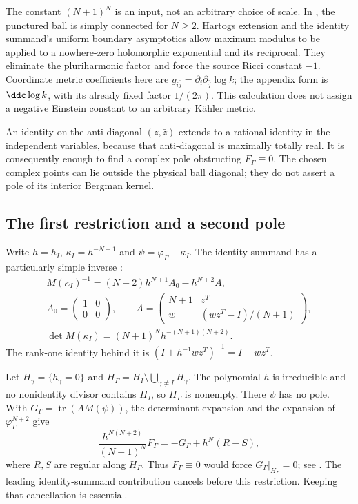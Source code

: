 The constant $(N+1)^N$ is an input, not an arbitrary choice of
scale. In \cite[Lemma~4.2]{EbenfeltXiaoXu21BallQuotientsAdvance},
the punctured ball is simply connected for $N\geq2$.
Hartogs extension and the identity summand's uniform boundary
asymptotics allow maximum modulus to be applied to a nowhere-zero
holomorphic exponential and its reciprocal. They eliminate
the pluriharmonic factor and force the source Ricci constant
$-1$. Coordinate metric coefficients here are
$g_{i\bar j}=\partial_i\partial_{\bar j}\log k$;
the appendix form is $\ddc\log k$, with its already fixed factor
$1/(2\pi)$. This calculation does not assign a negative Einstein
constant to an arbitrary K\"ahler metric.

An identity on the anti-diagonal $(z,\bar z)$ extends to a
rational identity in the independent variables, because that
anti-diagonal is maximally totally real. It is consequently
enough to find a complex pole obstructing $F_\Gamma\equiv0$.
The chosen complex points can lie outside the physical ball
diagonal; they do not assert a pole of its interior Bergman kernel.

\subsection{The first restriction and a second pole}
\label{sec:appH-ball-quotient-poles}

Write $h=h_I$, $\kappa_I=h^{-N-1}$ and
$\psi=\varphi_\Gamma-\kappa_I$. The identity summand has a
particularly simple inverse
\cite[Lemma~3.1]{GangulySahi26BallQuotientsV1}:
\begin{equation*}
 \begin{gathered}
 M(\kappa_I)^{-1}=(N+2)h^{N+1}A_0-h^{N+2}A,\\
 A_0=\begin{pmatrix}1&0\\0&0\end{pmatrix},\qquad
 A=\begin{pmatrix}N+1&z^T\\w&(wz^T-I)/(N+1)\end{pmatrix},\\
 \det M(\kappa_I)=(N+1)^N h^{-(N+1)(N+2)}.
 \end{gathered}
 \tag{H.43}\label{eq:appH-ball-quotient-inverse}
\end{equation*}
The rank-one identity behind it is
$(I+h^{-1}wz^T)^{-1}=I-wz^T$.

Let $H_\gamma=\{h_\gamma=0\}$ and
$H_\Gamma=H_I\setminus\bigcup_{\gamma\ne I}H_\gamma$.
The polynomial $h$ is irreducible and no nonidentity divisor
contains $H_I$, so $H_\Gamma$ is nonempty. There $\psi$ has
no pole. With $G_\Gamma=\operatorname{tr}(A M(\psi))$, the
determinant expansion and the expansion of
$\varphi_\Gamma^{N+2}$ give
\begin{equation*}
 \frac{h^{N(N+2)}}{(N+1)^N}F_\Gamma
       =-G_\Gamma+h^N(R-S),
 \tag{H.44}\label{eq:appH-ball-quotient-first-pole}
\end{equation*}
where $R,S$ are regular along $H_\Gamma$.
Thus $F_\Gamma\equiv0$ would force $G_\Gamma|_{H_\Gamma}=0$;
see \cite[Proposition~3.3]{GangulySahi26BallQuotientsV1}.
The leading identity-summand contribution cancels before this
restriction. Keeping that cancellation is essential.

